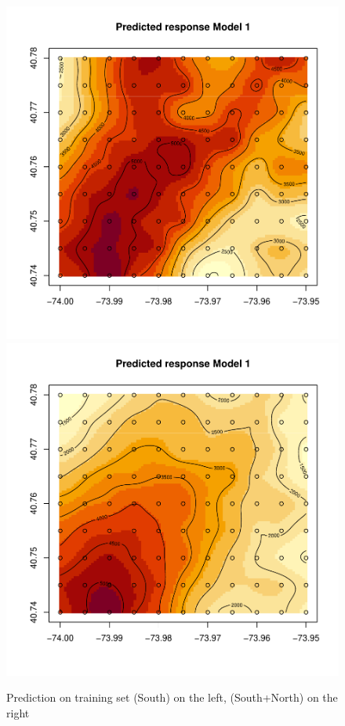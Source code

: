 \documentclass[12pt]{article}
\begin{document}
\begin{figure}[H]
		\centering
		\includegraphics[scale=0.50]{Plots_South/v1_south_pred_grid.pdf}
		\includegraphics[scale=0.50]{Plots_North+South/v1_both_pred_grid.pdf}
		\caption{Prediction on training set (South) on the left, (South+North) on the right}\label{pred1}
\end{figure}
\end{document}
